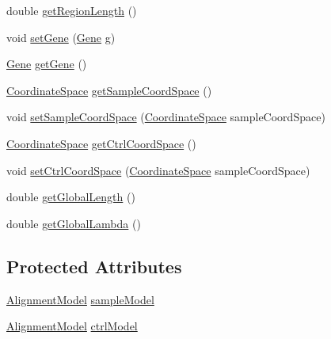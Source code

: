 \begin{DoxyCompactItemize}
\item 
double \hyperlink{classumms_1_1core_1_1model_1_1score_1_1_multi_score_a42ee81eee6d3792d4ed816c5fa9a98f3}{get\+Region\+Length} ()
\item 
void \hyperlink{classumms_1_1core_1_1model_1_1score_1_1_multi_score_a7f355b3f2c4188e6a979e08b036514d4}{set\+Gene} (\hyperlink{classumms_1_1core_1_1annotation_1_1_gene}{Gene} g)
\item 
\hyperlink{classumms_1_1core_1_1annotation_1_1_gene}{Gene} \hyperlink{classumms_1_1core_1_1model_1_1score_1_1_multi_score_a259b3430738009d5c8f95374ad1ba225}{get\+Gene} ()
\item 
\hyperlink{interfaceumms_1_1core_1_1coordinatesystem_1_1_coordinate_space}{Coordinate\+Space} \hyperlink{classumms_1_1core_1_1model_1_1score_1_1_multi_score_ac5835952a0c41b13c469808d426f2d25}{get\+Sample\+Coord\+Space} ()
\item 
void \hyperlink{classumms_1_1core_1_1model_1_1score_1_1_multi_score_aba6b9a6517ac4e978ef082acdbe470c1}{set\+Sample\+Coord\+Space} (\hyperlink{interfaceumms_1_1core_1_1coordinatesystem_1_1_coordinate_space}{Coordinate\+Space} sample\+Coord\+Space)
\item 
\hyperlink{interfaceumms_1_1core_1_1coordinatesystem_1_1_coordinate_space}{Coordinate\+Space} \hyperlink{classumms_1_1core_1_1model_1_1score_1_1_multi_score_ae9e83e53efa37b7da7494b6d331e5c42}{get\+Ctrl\+Coord\+Space} ()
\item 
void \hyperlink{classumms_1_1core_1_1model_1_1score_1_1_multi_score_ad82f4f3db08d2c755726216ef3a4f413}{set\+Ctrl\+Coord\+Space} (\hyperlink{interfaceumms_1_1core_1_1coordinatesystem_1_1_coordinate_space}{Coordinate\+Space} sample\+Coord\+Space)
\item 
double \hyperlink{classumms_1_1core_1_1model_1_1score_1_1_multi_score_a1af2e8503a14f8ddf03000335df764c1}{get\+Global\+Length} ()
\item 
double \hyperlink{classumms_1_1core_1_1model_1_1score_1_1_multi_score_a31618efad19a0e51a2816e1d132aba07}{get\+Global\+Lambda} ()
\end{DoxyCompactItemize}
\subsection*{Protected Attributes}
\begin{DoxyCompactItemize}
\item 
\hyperlink{classumms_1_1core_1_1model_1_1_alignment_model}{Alignment\+Model} \hyperlink{classumms_1_1core_1_1model_1_1score_1_1_multi_score_a778cb534f4ecab1514d08f5c5dc47a47}{sample\+Model}
\item 
\hyperlink{classumms_1_1core_1_1model_1_1_alignment_model}{Alignment\+Model} \hyperlink{classumms_1_1core_1_1model_1_1score_1_1_multi_score_ad2cbf957a05a1fb3e0337dcb4b95ab91}{ctrl\+Model}
\end{DoxyCompactItemize}
